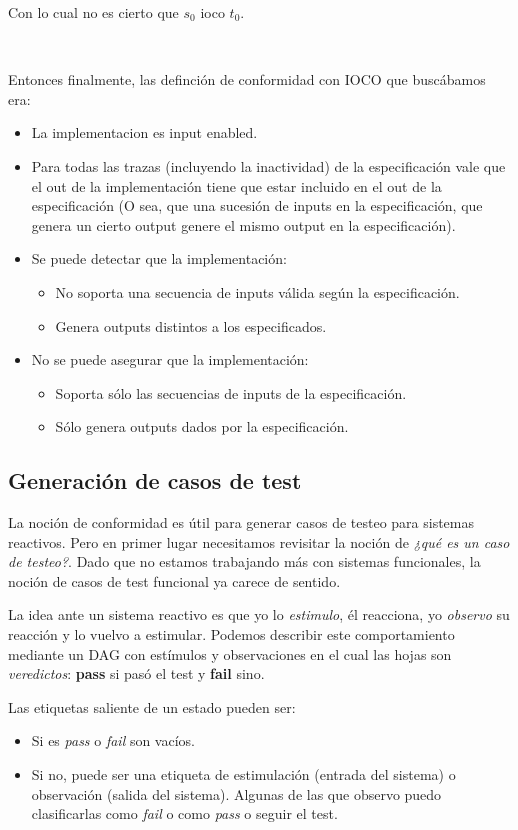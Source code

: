 \documentclass[]{article}
\begin{document}
Con lo cual no es cierto que $s_0$ ioco $t_0$.

~\newline

Entonces finalmente, las definción de conformidad con IOCO que buscábamos era:
\begin{itemize}
	\item La implementacion es input enabled.
	\item Para todas las trazas (incluyendo la inactividad) de la especificación vale que el out de la implementación tiene que estar incluido en el out de la especificación (O sea, que una sucesión de inputs en la especificación, que genera un cierto output genere el mismo output en la especificación).
	\item Se puede detectar que la implementación:
	\begin{itemize}
		\item No soporta una secuencia de inputs válida según la especificación.
		\item Genera outputs distintos a los especificados.
	\end{itemize}
	\item No se puede asegurar que la implementación:
	\begin{itemize}
		\item Soporta sólo las secuencias de inputs de la especificación.
		\item Sólo genera outputs dados por la especificación.
	\end{itemize}
\end{itemize}

\subsection{Generación de casos de test}
La noción de conformidad es útil para generar casos de testeo para sistemas reactivos. Pero en primer lugar necesitamos revisitar la noción de \textit{¿qué es un caso de testeo?}. Dado que no estamos trabajando más con sistemas funcionales, la noción de casos de test funcional ya carece de sentido.

La idea ante un sistema reactivo es que yo lo \textit{estimulo}, él reacciona, yo \textit{observo} su reacción y lo vuelvo a estimular. Podemos describir este comportamiento mediante un DAG con estímulos y observaciones en el cual las hojas son \textit{veredictos}: \textbf{pass} si pasó el test y \textbf{fail} sino.

Las etiquetas saliente de un estado pueden ser:
\begin{itemize}
	\item Si es \textit{pass} o \textit{fail} son vacíos.
	\item Si no, puede ser una etiqueta de estimulación (entrada del sistema) o observación (salida del sistema). Algunas de las que observo puedo clasificarlas como \textit{fail} o como \textit{pass} o seguir el test.
\end{itemize}
\end{document}

